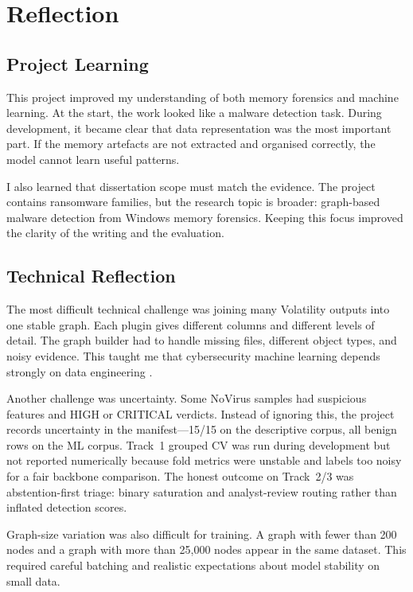 \chapter{Reflection}

\section{Project Learning}

This project improved my understanding of both memory forensics and machine learning. At the start, the work looked like a malware detection task. During development, it became clear that data representation was the most important part. If the memory artefacts are not extracted and organised correctly, the model cannot learn useful patterns.

I also learned that dissertation scope must match the evidence. The project contains ransomware families, but the research topic is broader: graph-based malware detection from Windows memory forensics. Keeping this focus improved the clarity of the writing and the evaluation.

\section{Technical Reflection}

The most difficult technical challenge was joining many Volatility outputs into one stable graph. Each plugin gives different columns and different levels of detail. The graph builder had to handle missing files, different object types, and noisy evidence. This taught me that cybersecurity machine learning depends strongly on data engineering \cite{sculley2015debt}.

Another challenge was uncertainty. Some NoVirus samples had suspicious features and HIGH or CRITICAL verdicts. Instead of ignoring this, the project records uncertainty in the manifest---15/15 on the descriptive corpus, all benign rows on the ML corpus. Track~1 grouped CV was run during development but not reported numerically because fold metrics were unstable and labels too noisy for a fair backbone comparison. The honest outcome on Track~2/3 was abstention-first triage: binary saturation and analyst-review routing rather than inflated detection scores.

Graph-size variation was also difficult for training. A graph with fewer than 200 nodes and a graph with more than 25,000 nodes appear in the same dataset. This required careful batching and realistic expectations about model stability on small data.

